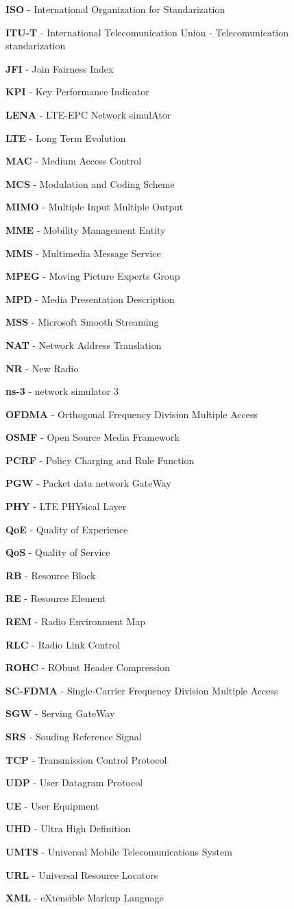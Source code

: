 \textbf{ISO} - International Organization for Standarization

\textbf{ITU-T} - International Telecomunication Union - Telecomunication standarization

\textbf{JFI} - Jain Fairness Index

\textbf{KPI} - Key Performance Indicator

\textbf{LENA} - LTE-EPC Network simulAtor

\textbf{LTE} - Long Term Evolution

\textbf{MAC} - Medium Access Control

\textbf{MCS} - Modulation and Coding Scheme

\textbf{MIMO} - Multiple Input Multiple Output

\textbf{MME} - Mobility Management Entity

\textbf{MMS} - Multimedia Message Service

\textbf{MPEG} - Moving Picture Experts Group

\textbf{MPD} - Media Presentation Description

\textbf{MSS} - Microsoft Smooth Streaming

\textbf{NAT} - Network Address Translation

\textbf{NR} - New Radio

\textbf{ns-3} - network simulator 3

\textbf{OFDMA} - Orthogonal Frequency Division Multiple Access

\textbf{OSMF} - Open Source Media Framework

\textbf{PCRF} - Policy Charging and Rule Function

\textbf{PGW} - Packet data network GateWay

\textbf{PHY} - LTE PHYsical Layer

\textbf{QoE} - Quality of Experience

\textbf{QoS} - Quality of Service

\textbf{RB} - Resource Block

\textbf{RE} - Resource Element

\textbf{REM} - Radio Environment Map

\textbf{RLC} - Radio Link Control

\textbf{ROHC} - RObust Header Compression

\textbf{SC-FDMA} - Single-Carrier Frequency Division Multiple Access

\textbf{SGW} - Serving GateWay

\textbf{SRS} - Souding Reference Signal

\textbf{TCP} - Transmission Control Protocol

\textbf{UDP} - User Datagram Protocol

\textbf{UE} - User Equipment

\textbf{UHD} - Ultra High Definition

\textbf{UMTS} - Universal Mobile Telecomunications System

\textbf{URL} - Universal Resource Locators

\textbf{XML} - eXtensible Markup Language


\cleardoublepage
